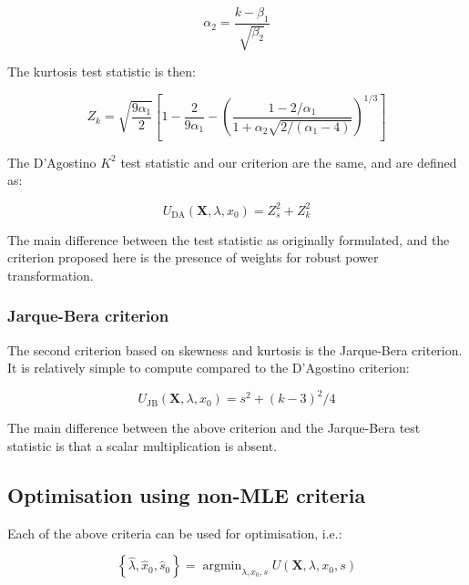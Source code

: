 \documentclass[preprint,12pt,authoryear]{elsarticle}
\DeclareMathOperator*{\argmin}{argmin}
\begin{document}
\begin{equation}
\alpha_2 = \frac{k - \beta_1}{\sqrt{\beta_2}}
\end{equation}

The kurtosis test statistic is then:

\begin{equation}
Z_k = \sqrt{\frac{9 \alpha_1}{2}} \left[ 1 - \frac{2}{9 \alpha_1} - \left(\frac{1 - 2 / \alpha_1}{1 + \alpha_2 \sqrt{2 / \left(\alpha_1 - 4 \right)}} \right)^{1 / 3}  \right]
\end{equation}

The D'Agostino \(K^2\) test statistic and our criterion are the same,
and are defined as:

\begin{equation}
U_{\text{DA}} \left(\mathbf{X}, \lambda, x_0 \right) = Z_s^2 + Z_k^2
\end{equation}

The main difference between the test statistic as originally formulated,
and the criterion proposed here is the presence of weights for robust
power transformation.

\subsubsection{Jarque-Bera criterion}\label{jarque-bera-criterion}

The second criterion based on skewness and kurtosis is the Jarque-Bera
criterion. It is relatively simple to compute compared to the D'Agostino
criterion:

\begin{equation}
U_{\text{JB}} \left(\mathbf{X}, \lambda, x_0 \right) = s^2 + \left(k - 3\right)^2 / 4
\end{equation}

The main difference between the above criterion and the Jarque-Bera test
statistic \citep{Jarque1980-hw} is that a scalar multiplication is absent.

\subsection{Optimisation using non-MLE
criteria}\label{optimisation-using-non-mle-criteria}

Each of the above criteria can be used for optimisation, i.e.:

\begin{equation}
\left\{ \hat{\lambda}, \hat{x}_0, \hat{s}_0 \right\} = \argmin_{\lambda, x_0, s} U\left(\mathbf{X}, \lambda, x_0, s \right)
\end{equation}
\end{document}
